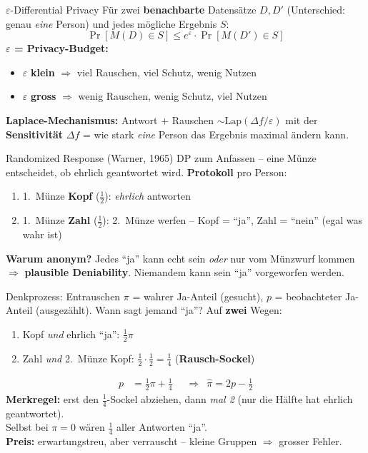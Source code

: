 \documentclass[a4paper, fontsize=7pt]{scrartcl}
\begin{document}
\begin{mainbox}{$\varepsilon$-Differential Privacy}
Für zwei \textbf{benachbarte} Datensätze $D, D'$ (Unterschied: genau
\emph{eine} Person) und jedes mögliche Ergebnis $S$:
$$\boxed{\Pr[M(D) \in S] \le e^{\varepsilon} \cdot \Pr[M(D') \in S]}$$
\textbf{$\varepsilon$ = Privacy-Budget:}
\begin{itemize}
    \item $\varepsilon$ \textbf{klein} $\Rightarrow$ viel Rauschen, viel
          Schutz, wenig Nutzen
    \item $\varepsilon$ \textbf{gross} $\Rightarrow$ wenig Rauschen, wenig
          Schutz, viel Nutzen
\end{itemize}
\textbf{Laplace-Mechanismus:} Antwort $+$ Rauschen
$\sim \mathrm{Lap}(\Delta f / \varepsilon)$ mit der
\textbf{Sensitivität} $\Delta f$ = wie stark \emph{eine} Person das
Ergebnis maximal ändern kann.
\end{mainbox}

\begin{mainbox}{Randomized Response (Warner, 1965)}
DP zum Anfassen -- eine Münze entscheidet, ob ehrlich geantwortet wird.
\textbf{Protokoll} pro Person:
\begin{enumerate}
    \item 1.\ Münze \textbf{Kopf} ($\tfrac12$): \emph{ehrlich} antworten
    \item 1.\ Münze \textbf{Zahl} ($\tfrac12$): 2.\ Münze werfen --
          Kopf = ``ja'', Zahl = ``nein'' (egal was wahr ist)
\end{enumerate}
\textbf{Warum anonym?} Jedes ``ja'' kann echt sein \emph{oder} nur vom
Münzwurf kommen $\Rightarrow$ \textbf{plausible Deniability}. Niemandem
kann sein ``ja'' vorgeworfen werden.
\end{mainbox}

\begin{subbox}{Denkprozess: Entrauschen}
$\pi$ = wahrer Ja-Anteil (gesucht), $p$ = beobachteter Ja-Anteil
(ausgezählt). Wann sagt jemand ``ja''? Auf \textbf{zwei} Wegen:
\begin{enumerate}
    \item Kopf \emph{und} ehrlich ``ja'': $\tfrac12 \pi$
    \item Zahl \emph{und} 2.\ Münze Kopf: $\tfrac12 \cdot \tfrac12
          = \tfrac14$ (\textbf{Rausch-Sockel})
\end{enumerate}
\begin{align*}
p &= \tfrac12 \pi + \tfrac14
  &&\Rightarrow&
\boxed{\hat{\pi} = 2p - \tfrac12}
\end{align*}
\textbf{Merkregel:} erst den $\tfrac14$-Sockel abziehen, dann
\emph{mal 2} (nur die Hälfte hat ehrlich geantwortet).\\
Selbst bei $\pi = 0$ wären $\tfrac14$ aller Antworten ``ja''.\\
\textbf{Preis:} erwartungstreu, aber verrauscht -- kleine Gruppen
$\Rightarrow$ grosser Fehler.
\end{subbox}
\end{document}
